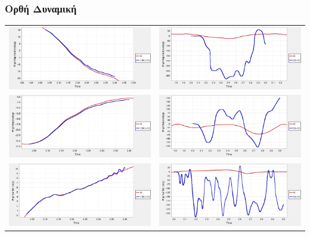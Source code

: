 \documentclass[8pt,sans,mathserif]{beamer}%
\begin{document}
\begin{frame}
\frametitle{Ορθή Δυναμική}

    \begin{tabular}{cc}
        \includegraphics[width=.48\textwidth, keepaspectratio]{fig/hip-ik-cmc.png} & \includegraphics[width=.48\textwidth, keepaspectratio]{fig/hip-ik-id.png}\\[3pt]
        \includegraphics[width=.48\textwidth, keepaspectratio]{fig/knee-ik-cmc.png} & \includegraphics[width=.48\textwidth, keepaspectratio]{fig/knee-ik-id.png}\\[3pt]
        \includegraphics[width=.48\textwidth, keepaspectratio]{fig/ankle-ik-cmc.png} & \includegraphics[width=.48\textwidth, keepaspectratio]{fig/ankle-ik-id.png}
    \end{tabular}

\end{frame}
\end{document}
